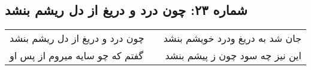 \begin{center}
\section*{شماره ۲۳: چون درد و دریغ از دل ریشم بنشد}
\label{sec:023}
\begin{longtable}{l p{0.5cm} r}
چون درد و دریغ از دل ریشم بنشد
&&
جان شد به دریغ ودرد خویشم بنشد
\\
گفتم که چو سایه میروم از پس او
&&
این نیز چه سود چون ز پیشم بنشد
\\
\end{longtable}
\end{center}
